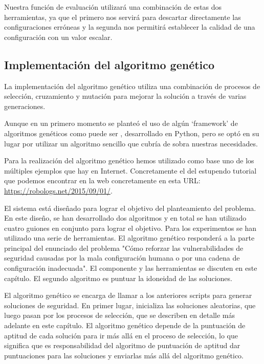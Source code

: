 \bigskip
Nuestra función de evaluación utilizará una combinación de estas dos herramientas, ya que el primero nos servirá para descartar directamente las configuraciones erróneas y la segunda nos permitirá establecer la calidad de una configuración con un valor escalar.

\subsection{Implementación del algoritmo genético}

La implementación del algoritmo genético utiliza una combinación de procesos de selección, cruzamiento y mutación para mejorar la solución a través de varias generaciones.

\bigskip
Aunque en un primero momento se planteó el uso de algún `framework' de algoritmos genéticos como puede ser , desarrollado en Python, pero se optó en su lugar por utilizar un algoritmo sencillo que cubría de sobra nuestras necesidades.

\bigskip
Para la realización del algoritmo genético hemos utilizado como base uno de los múltiples ejemplos que hay en Internet. Concretamente el del estupendo tutorial que podemos encontrar en la web  concretamente en esta URL: \url{https://robologs.net/2015/09/01/}.

\bigskip
El sistema está diseñado para lograr el objetivo del planteamiento del problema. En este diseño, se han desarrollado dos algoritmos y en total se han utilizado cuatro guiones en conjunto para lograr el objetivo. Para los experimentos se han utilizado una serie de herramientas. El algoritmo genético responderá a la parte principal del enunciado del problema "Cómo reforzar las vulnerabilidades de seguridad causadas por la mala configuración humana o por una cadena de configuración inadecuada". El componente y las herramientas se discuten en este capítulo. El segundo algoritmo es puntuar la idoneidad de las soluciones.

\bigskip
El algoritmo genético se encarga de llamar a los anteriores scripts para generar soluciones de seguridad. En primer lugar, inicializa las soluciones aleatorias, que luego pasan por los procesos de selección, que se describen en detalle más adelante en este capítulo. El algoritmo genético depende de la puntuación de aptitud de cada solución para ir más allá en el proceso de selección, lo que significa que es responsabilidad del algoritmo de puntuación de aptitud dar puntuaciones para las soluciones y enviarlas más allá del algoritmo genético.

